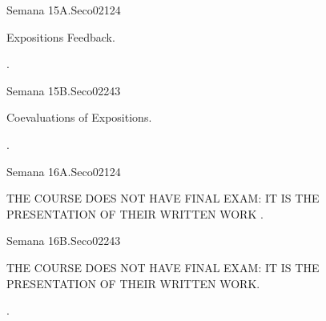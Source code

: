 \begin{syllabus}
\begin{unit}{Semana 15A.}{}{Seco02}{12}{4}
   \begin{topics}
      \item Expositions Feedback.
   \end{topics}
   \begin{learningoutcomes}
      \item .
   \end{learningoutcomes}
\end{unit}

\begin{unit}{Semana 15B.}{}{Seco02}{24}{3}
   \begin{topics}
      \item Coevaluations of  Expositions.
   \end{topics}

   \begin{learningoutcomes}
      \item .
      \end{learningoutcomes}
\end{unit}

\begin{unit}{Semana 16A.}{}{Seco02}{12}{4}
   \begin{topics}
      \item THE COURSE DOES NOT HAVE FINAL EXAM: IT IS THE PRESENTATION OF THEIR  WRITTEN WORK .
   \end{topics}
   \begin{learningoutcomes}
      \item 
   \end{learningoutcomes}
\end{unit}

\begin{unit}{Semana 16B.}{}{Seco02}{24}{3}
   \begin{topics}
      \item THE COURSE DOES NOT HAVE FINAL EXAM: IT IS THE PRESENTATION OF THEIR  WRITTEN WORK.
   \end{topics}

   \begin{learningoutcomes}
      \item .
      \end{learningoutcomes}
\end{unit}


\begin{coursebibliography}
\end{coursebibliography}

\end{syllabus}
